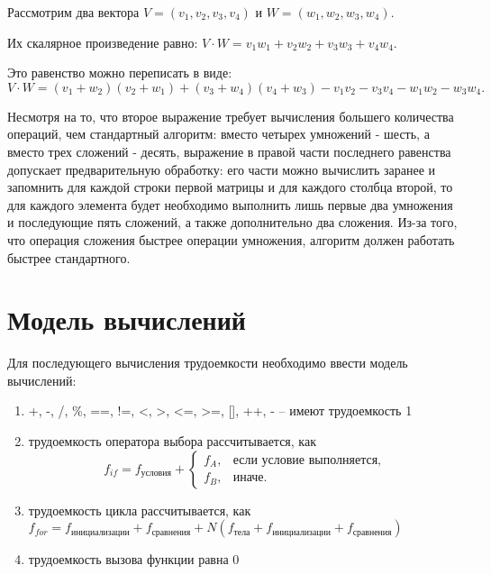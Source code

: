 Рассмотрим два вектора $V = (v_1, v_2, v_3, v_4)$ и $W = (w_1, w_2, w_3, w_4)$.

Их скалярное произведение равно: 
$V\cdot W = v_1w_1 + v_2w_2 + v_3w_3 + v_4w_4$.

Это равенство можно переписать в виде: 
\[
V\cdot W = (v_1 + w_2)(v_2 + w_1) + (v_3 + w_4)(v_4 + w_3) - v_1v_2 - v_3v_4 - w_1w_2 - w_3w_4.
\]

Несмотря на то, что второе выражение требует вычисления большего количества операций, чем стандартный алгоритм: вместо четырех умножений - шесть, а вместо трех сложений - десять, выражение в правой части последнего равенства допускает предварительную обработку: его части можно вычислить заранее и запомнить для каждой строки первой матрицы и для каждого столбца второй, то для каждого элемента будет необходимо выполнить лишь первые два умножения и последующие пять сложений, а также дополнительно два сложения. Из-за того, что операция сложения быстрее операции умножения, алгоритм должен работать быстрее стандартного.

\section{Модель вычислений}

Для последующего вычисления трудоемкости необходимо ввести модель вычислений:
\begin{enumerate}
	\item +, -, /, \%, ==, !=, <, >, <=, >=, [], ++, \-- -- имеют трудоемкость 1
	\item трудоемкость оператора выбора  рассчитывается, как 
	\[ f_{if} = f_{\text{условия}} + 
	\begin{cases}
	f_A, & \text{если условие выполняется,}\\
	f_B, & \text{иначе.}
	\end{cases} \]
	\item трудоемкость цикла рассчитывается, как $f_{for} = f_{\text{инициализации}} + f_{\text{сравнения}} + N(f_{\text{тела}} + f_{\text{инициализации}} + f_{\text{сравнения}})$
	\item трудоемкость вызова функции равна 0
\end{enumerate}
